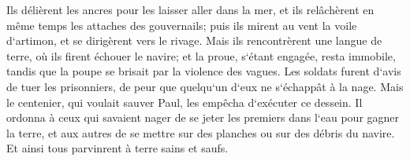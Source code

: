 \verse Ils délièrent les ancres pour les laisser aller dans la mer, et ils relâchèrent en même temps les attaches des gouvernails; puis ils mirent au vent la voile d`artimon, et se dirigèrent vers le rivage. 
\verse Mais ils rencontrèrent une langue de terre, où ils firent échouer le navire; et la proue, s`étant engagée, resta immobile, tandis que la poupe se brisait par la violence des vagues. 
\verse Les soldats furent d`avis de tuer les prisonniers, de peur que quelqu`un d`eux ne s`échappât à la nage. 
\verse Mais le centenier, qui voulait sauver Paul, les empêcha d`exécuter ce dessein. Il ordonna à ceux qui savaient nager de se jeter les premiers dans l`eau pour gagner la terre, 
\verse et aux autres de se mettre sur des planches ou sur des débris du navire. Et ainsi tous parvinrent à terre sains et saufs. 

\chapter{}

